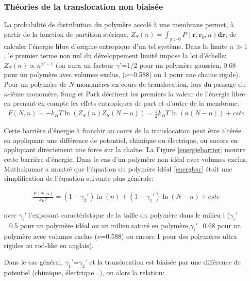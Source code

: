\documentclass[a4paper,11pt]{article}
\begin{document}
\subsubsection{Théories de la translocation non biaisée}


La probabilité de distribution du polymère accolé à une membrane permet, à partir de la fonction de partition stérique, $Z_S(n)= \int_{y>0} P(\textbf{r},\textbf{r}_0,n) \textbf{dr}$, de calculer l'énergie libre d'origine entropique d'un tel système. Dans la limite $n \gg 1$, le premier terme non nul du développement limité impose la loi d'échelle: $Z_S(n) \propto n^{\gamma'-1}$ (on aura un facteur $\gamma'$=1/2 pour un polymère gaussien, 0.68 pour un polymère avec volumes exclus,  ($\nu$=0.588) ou 1 pour une chaine rigide). Pour un polymère de $N$ monomères en cours de translocation, lors du passage du $n$-ième monomère, Sung et Park \cite{Sung1996} décrirent les premiers la valeur de l'énergie libre en prenant en compte les effets entropiques de part et d'autre de la membrane:
\begin{eqnarray}
F(N,n)= -k_BT\ln\left(Z_S(n)Z_S(N-n)\right)= \frac{1}{2} k_BT \ln \left(n(N-n)\right) +cste
\label{energbar}
\end{eqnarray}

Cette barrière d'énergie à franchir au cours de la translocation peut être altérée en appliquant une différence de potentiel, chimique ou électrique, ou encore en appliquant directement une force sur la chaîne. La Figure \ref{energiebarrier} montre cette barrière d'énergie.
 Dans le cas d'un polymère non idéal avec volumes exclus, Muthukumar \cite{Muthukumar1999} a montré que l'équation du polymère idéal \ref{energbar} était une simplification de l'équation suivante plus générale:

\begin{eqnarray}
\frac{F(N,n)}{k_BT}= (1-\gamma_2')\ln(n)+ (1-\gamma_1')\ln(N-n)+cste
\label{energbarsaw}
\end{eqnarray}

avec $\gamma_i'$ l'exposant caractéristique de la taille du polymère dans le milieu i ($\gamma_i'$=0.5 pour un polymère idéal ou un milieu saturé en polymère,$\gamma_i'$=0.68  pour un polymère avec volumes exclus ($\nu$=0.588) ou encore 1 pour des polymères ultra rigides ou rod-like en anglais).

Dans le cas général, $\gamma_1'$=$\gamma_2'$ et la translocation est biaisée par une différence de potentiel (chimique, électrique...), on alors la relation:
\end{document}

